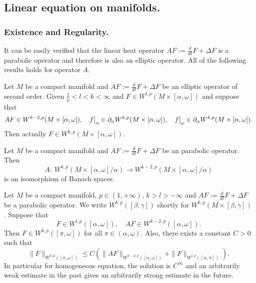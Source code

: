 \subsection{Linear equation on manifolds.}
\label{sec:orgb9f137c}

\subsubsection{Existence and Regularity.}
\label{sec:orgff9fdf8}

It can be easily verified that the linear heat operator \(AF:= \frac{d}{dt}F + \Delta F\)
is a parabolic operator and therefore is also an elliptic operator. All of the following results
holds for operator \(A\).

\begin{theorem}
\label{thm:elliptic-d}
Let \(M\) be a compact manifold and \(AF:= \frac{d}{dt}F + \Delta F\) be an elliptic
operator of second order. Given \(\frac{1}{p} < l < k <\infty\) and \(F\in
W^{l,p}(M\times[\alpha,\omega])\) and suppose that 
\[
 AF\in W^{k-2,p}(M\times[\alpha,\omega]),\quad \restr{f}{\alpha}\in \partial_\alpha
W^{k,p}(M\times[\alpha,\omega]), \quad  \restr{f}{\omega}\in \partial_\alpha W^{k,p}(M\times[\alpha,\omega]).
\]
Then actually \(F\in W^{k,p}(M\times[\alpha,\omega])\).
\end{theorem}


\begin{theorem}
\label{thm:para-existence-d}
Let \(M\) be a compact manifold and \(AF:= \frac{d}{dt}F + \Delta F\) be an parabolic
operator. Then 
\[
 A:\ W^{k,p}(M\times[\alpha,\omega]/\alpha) \longrightarrow W^{k-2,p}(M\times[\alpha,\omega]/\alpha)
\]
is an isomorphism of Banach spaces.
\end{theorem}


\begin{theorem}
\label{thm:para-eq-d }
Let \(M\) be a compact manifold, \(p\in (1,+\infty)\), \(k > l > -\infty\) and \(AF:= \frac{d}{dt}F + \Delta F\) be a parabolic operator. We write \(W^{k,p}([\beta,\gamma])\) shortly for \(W^{k,p}(M\times[\beta,\gamma])\). Suppose that
\[
 F\in W^{l,p}([\alpha,\omega]),\quad AF\in W^{k-2,p}([\alpha,\omega]).
\]
Then \(F\in W^{k,p}([\pi,\omega])\) for all \(\pi\in (\alpha,\omega)\). Also, there
exists a constant \(C>0\) such that 
\[
 \|F\|_{W^{k,p}([\pi,\omega])} \leq C \left( \|AF\|_{W^{k-2,p}([\alpha,\omega])} + \| F \|_{W^{l,p}([\alpha,\pi])}  \right).
\]
In particular for homogeneous equation, the solution is \(C^\infty\) and an arbitrarily weak estimate in the past gives an arbitrarily strong estimate in the future. 
\end{theorem}


